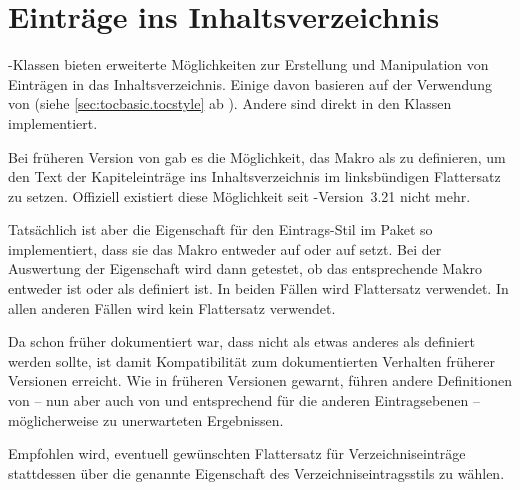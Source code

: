 \section{Einträge ins Inhaltsverzeichnis}

\KOMAScript-Klassen bieten erweiterte Möglichkeiten zur Erstellung und
Manipulation von Einträgen in das Inhaltsverzeichnis. Einige davon basieren
auf der Verwendung von  (siehe
\autoref{sec:tocbasic.tocstyle} ab
). Andere sind direkt in den Klassen
implementiert.


\begin{Declaration}
\end{Declaration}
Bei früheren Version
von \KOMAScript{} gab es die Möglichkeit, das Makro 
als  zu definieren, um den Text der Kapiteleinträge ins
Inhaltsverzeichnis im linksbündigen Flattersatz zu setzen. Offiziell existiert
diese Möglichkeit seit \KOMAScript-Version~3.21 nicht mehr.

Tatsächlich ist aber die Eigenschaft  für den
Eintrags-Stil  im Paket
\hyperref[cha:tocbasic]{} so
implementiert, dass sie das Makro 
entweder auf  oder auf  setzt. Bei der
Auswertung der Eigenschaft wird dann getestet, ob das entsprechende Makro
entweder  ist oder als  definiert
ist. In beiden Fällen wird Flattersatz verwendet. In allen anderen Fällen wird
kein Flattersatz verwendet.

Da schon früher dokumentiert war, dass  nicht
als etwas anderes als  definiert werden sollte, ist damit
Kompatibilität zum dokumentierten Verhalten früherer Versionen erreicht. Wie
in früheren Versionen gewarnt, führen andere Definitionen von
 -- nun aber auch von  und
entsprechend für die anderen Eintragsebenen -- möglicherweise zu unerwarteten
Ergebnissen.

Empfohlen wird, eventuell gewünschten Flattersatz für Verzeichniseinträge
stattdessen über die genannte Eigenschaft des Verzeichniseintragsstils
 zu wählen.%
\EndIndexGroup


